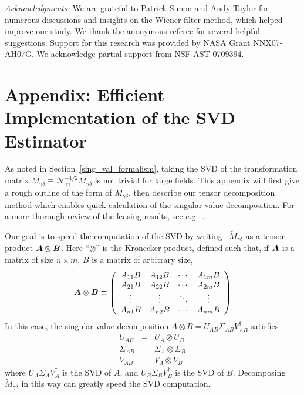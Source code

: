 {\it Acknowledgments:} We are grateful to Patrick Simon and Andy
Taylor for numerous discussions and insights on the Wiener filter method, 
which helped improve our study.  We thank the anonymous referee for
several helpful suggestions.
Support for this research was provided by NASA Grant NNX07-AH07G.
We acknowledge partial support from NSF AST-0709394.




\section{Appendix: Efficient Implementation of the SVD Estimator}
\label{app}
As noted in Section~\ref{sing_val_formalism}, taking the SVD of the 
transformation matrix $\widetilde{M}_{\gamma\delta} \equiv 
\mathcal{N}_{\gamma\gamma}^{-1/2}M_{\gamma\delta}$
is not trivial for large fields.  This appendix will first give a rough
outline of the form of $M_{\gamma\delta}$, then describe our tensor 
decomposition method which enables quick calculation of the singular
value decomposition.  For a more thorough review of the lensing results, 
see e.g.~\citet{Bartelmann01}.

Our goal is to speed the computation of the SVD by writing \
$\widetilde{M}_{\gamma\delta}$
as a tensor product $\boldsymbol{A} \otimes \boldsymbol{B}$.  Here ``$\otimes$''
is the Kronecker product, defined such that, if $\boldsymbol{A}$ is a matrix
of size $n \times m$, $B$ is a matrix of arbitrary size,
\begin{equation}
  \boldsymbol{A}\otimes\boldsymbol{B} \equiv \left(
  \begin{array}{cccc}
    A_{11}B & A_{12}B & \cdots & A_{1m}B \\
    A_{21}B & A_{22}B & \cdots & A_{2m}B \\
    \vdots  & \vdots & \ddots & \vdots  \\
    A_{n1}B & A_{n2}B & \cdots & A_{nm}B 
  \end{array}\right)
\end{equation}
In this case, the singular value decomposition
$A\otimes B = U_{AB}\Sigma_{AB}V^\dagger_{AB}$
satisfies
\begin{eqnarray}
  \label{AB_SVD}
  U_{AB} &=& U_A\otimes U_B \nonumber\\
  \Sigma_{AB} &=& \Sigma_A \otimes \Sigma_B\nonumber\\
  V_{AB} &=& V_A \otimes V_B
\end{eqnarray}
where $U_A\Sigma_AV^\dagger_A$ is the SVD of $A$, 
and   $U_B\Sigma_BV^\dagger_B$ is the SVD of $B$.
Decomposing $\widetilde{M}_{\gamma\delta}$ in this way can 
greatly speed the SVD computation.

